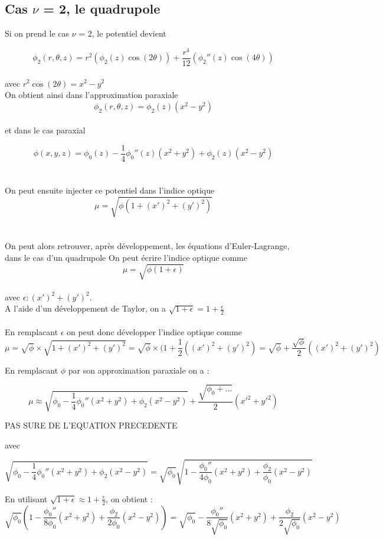 \documentclass{article}
\begin{document}
\subsection{Cas $\nu$ = 2, le quadrupole}
Si on prend le cas $\nu$ = 2, le potentiel devient 

\[
\phi_2(r,\theta,z) = r^{2}(\phi_2(z) \cos(2\theta)) + \frac{r^{4}}{12} (\phi_2''(z) \cos(4\theta))
\]
\\
avec $r^2\cos(2\theta)=x^2-y^2$
\\
On obtient ainsi dans l'approximation paraxiale 
\[
\phi_2(r, \theta, z) =\phi_2(z)(x^2 -y^2)
\]
\\
et dans le cas paraxial 

\[
\phi(x,y,z) = \phi_0(z) - \frac{1}{4}\phi_0''(z)(x^2+y^2) + \phi_2(z)(x^2 - y^2)
\]
\\
\\
On peut ensuite injecter ce potentiel dans l'indice optique 
\[
\mu = \sqrt{\phi(1+(x')^2 + (y')^2)}
\]
\\
\\
On peut alors retrouver, après développement, les équations d'Euler-Lagrange, dans le cas d'un quadrupole
On peut écrire l'indice optique comme 
\[
\mu = \sqrt{\phi(1+\epsilon)}
\]
\\
 avec $\epsilon : (x')^2 +(y')^2$.
\\
A l'aide d'un développement de Taylor, on a $\sqrt{1+\epsilon} = 1 +\frac{\epsilon}{2}$ \\
\\

En remplacant $\epsilon$ on peut donc développer l'indice optique comme 
\[
\mu = \sqrt{\phi}\times \sqrt{1+(x')^2 + (y')^2} = \sqrt{\phi}\times(1+\frac{1}{2}((x')^2 + (y')^2)  = \sqrt{\phi} + \frac{\sqrt{\phi}}{2}((x')^2 + (y')^2)
\]

En remplacant $\phi$ par son approximation paraxiale on a :

\[
\mu \approx \sqrt{\phi_0 - \frac{1}{4}\phi_0''(x^2+y^2) + \phi_2(x^2-y^2)} + \frac{\sqrt{\phi_0 + \dots}}{2}(x'^2+y'^2)
\]

{\color{red}PAS SURE DE L'EQUATION PRECEDENTE}

avec 

\[
\sqrt{\phi_0 - \frac{1}{4}\phi_0'' (x^2+y^2) + \phi_2(x^2-y^2)} = \sqrt{\phi_0} \sqrt{1 -\frac{\phi_0''}{4\phi_0}(x^2+y^2) + \frac{\phi_2}{\phi_0}(x^2-y^2)}
\]

En utilisant $\sqrt{1+\epsilon} \approx 1 + \frac{\epsilon}{2}$, on obtient :
 \[
\sqrt{\phi_0} \left( 1 - \frac{\phi_0''}{8\phi_0}(x^2+y^2) + \frac{\phi_2}{2\phi_0}(x^2-y^2) \right) = \sqrt{\phi_0} - \frac{\phi_0''}{8\sqrt{\phi_0}}(x^2+y^2) + \frac{\phi_2}{2\sqrt{\phi_0}}(x^2-y^2)
\]
\end{document}
